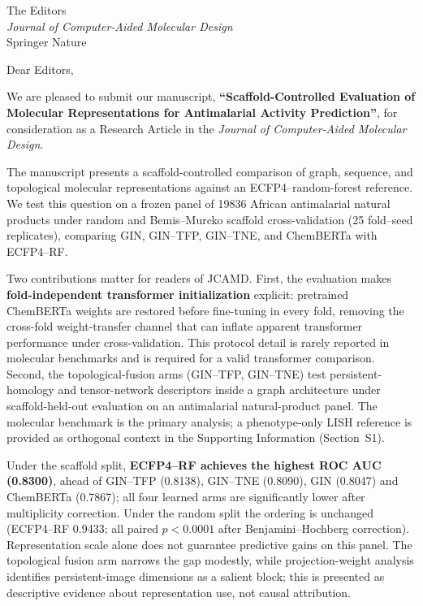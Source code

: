 \documentclass[11pt,a4paper]{letter}
\begin{document}
\begin{letter}{%
  The Editors \\
  \textit{Journal of Computer-Aided Molecular Design} \\
  Springer Nature
}

\opening{Dear Editors,}

We are pleased to submit our manuscript, \textbf{``Scaffold-Controlled Evaluation of Molecular Representations for Antimalarial Activity Prediction''}, for consideration as a Research Article in the \textit{Journal of Computer-Aided Molecular Design}.

The manuscript presents a scaffold-controlled comparison of graph, sequence, and topological molecular representations against an ECFP4--random-forest reference. We test this question on a frozen panel of \num{19836} African antimalarial natural products under random and Bemis--Murcko scaffold cross-validation (\num{25} fold--seed replicates), comparing GIN, GIN--TFP, GIN--TNE, and ChemBERTa with ECFP4--RF.

Two contributions matter for readers of JCAMD. First, the evaluation makes \textbf{fold-independent transformer initialization} explicit: pretrained ChemBERTa weights are restored before fine-tuning in every fold, removing the cross-fold weight-transfer channel that can inflate apparent transformer performance under cross-validation. This protocol detail is rarely reported in molecular benchmarks and is required for a valid transformer comparison. Second, the topological-fusion arms (GIN--TFP, GIN--TNE) test persistent-homology and tensor-network descriptors inside a graph architecture under scaffold-held-out evaluation on an antimalarial natural-product panel. The molecular benchmark is the primary analysis; a phenotype-only LISH reference is provided as orthogonal context in the Supporting Information (Section~S1).

Under the scaffold split, \textbf{ECFP4--RF achieves the highest ROC AUC (\num{0.8300})}, ahead of GIN--TFP (\num{0.8138}), GIN--TNE (\num{0.8090}), GIN (\num{0.8047}) and ChemBERTa (\num{0.7867}); all four learned arms are significantly lower after multiplicity correction. Under the random split the ordering is unchanged (ECFP4--RF \num{0.9433}; all paired $p < \num{0.0001}$ after Benjamini--Hochberg correction). Representation scale alone does not guarantee predictive gains on this panel. The topological fusion arm narrows the gap modestly, while projection-weight analysis identifies persistent-image dimensions as a salient block; this is presented as descriptive evidence about representation use, not causal attribution.


\end{letter}
\end{document}
